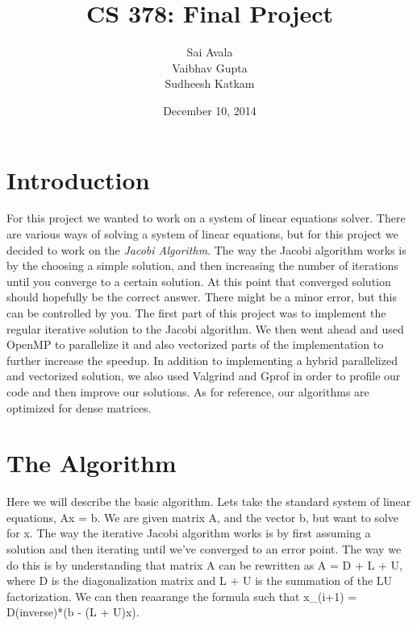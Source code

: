 \documentclass[10pt]{article}
\begin{document}
\title{CS 378: Final Project}
\author{Sai Avala \\ Vaibhav Gupta \\ Sudheesh Katkam}
\date{December 10, 2014}
\maketitle
\section{Introduction}
\label{introduction}
\sf For this project we wanted to work on a system of linear equations solver. There are various ways
of solving a system of linear equations, but for this project we decided to work on the
\textit{Jacobi Algorithm}. The way the Jacobi algorithm works is by the choosing a simple solution,
and then increasing the number of iterations until you converge to a certain solution. At this point
that converged solution should hopefully be the correct answer. There might be a minor error,
but this can be controlled by you. The first part of this project was to implement the regular
iterative solution to the Jacobi algorithm. We then went ahead and used OpenMP to parallelize it
and also vectorized parts of the implementation to further increase the speedup. In addition to 
implementing a hybrid parallelized and vectorized solution, we also used Valgrind and Gprof
in order to profile our code and then improve our solutions. As for reference, our algorithms
are optimized for dense matrices.

\section{The Algorithm}
\label{algorithm}
\sf Here we will describe the basic algorithm. Lets take the standard system of linear equations,
Ax = b. We are given matrix A, and the vector b, but want to solve for x. The way the iterative
Jacobi algorithm works is by first assuming a solution and then iterating until we've converged
to an error point. The way we do this is by understanding that matrix A can be rewritten as
A = D + L + U, where D is the diagonalization matrix and L + U is the summation of the LU
factorization. We can then reaarange the formula such that x\_(i+1) = D(inverse)*(b - (L + U)x).
\end{document}
